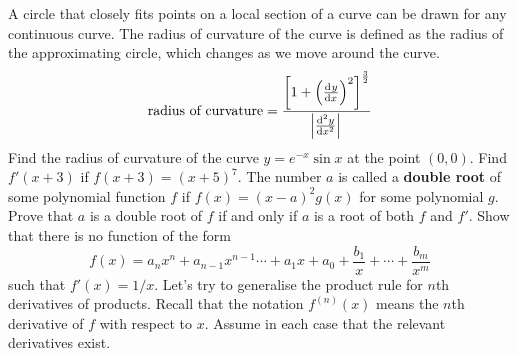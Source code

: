 \begin{questions}
  \questioE A circle that closely fits points on a local section of a curve can be drawn for any continuous curve. The
            radius of curvature of the curve is defined as the radius of the approximating circle, which changes as
            we move around the curve.
            \begin{displaymath}
              \textrm{radius of curvature} = \frac{\left[1 +  \left(\od{y}{x}\right)^2 \right]^{\frac{3}{2}}}{\abs{\od[2]{y}{x}}}
            \end{displaymath}
            Find the radius of curvature of the curve $ y = e^{-x} \sin x $ at the point $ (0, 0) $.
  \questioE Find $ f'(x + 3) $ if $ f(x + 3) = (x + 5)^7 $.
  \questioE The number $ a $ is called a \textbf{double root} of some polynomial function $ f $ if $ f(x) = (x - a)^2g(x) $ for
            some polynomial $ g $. Prove that $ a $ is a double root of $ f $ if and only if $ a $ is a root of both $ f $ and $ f' $.
  \questioE Show that there is no function of the form
            \begin{displaymath}
              f(x) = a_n x^n + a_{n - 1} x^{n - 1} \cdots + a_1 x + a_0 + \frac{b_1}{x} + \cdots + \frac{b_m}{x^m}
            \end{displaymath}
            such that $ f'(x) = 1/x $.
  \questioS Let's try to generalise the product rule for $ n$th derivatives of products. Recall that the notation $ f^{(n)}(x) $ means the $ n$th derivative
            of $ f $ with respect to $ x $. Assume in each case that the relevant derivatives exist.
\end{questions}

